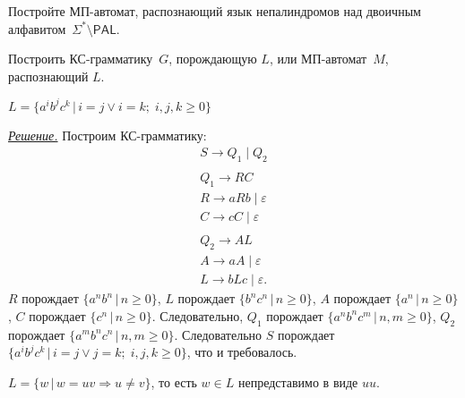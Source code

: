 \documentclass[10pt]{article}
\newcounter{pr} \setcounter{pr}{0}
\newcounter{subpr}[pr] \setcounter{subpr}{0}
\newenvironment{sol}
  {\par
   {\itshape \underline{Решение.}}}
  {}
\newcommand{\eps}{\varepsilon}
\newcommand{\PAL}{{\mathsf{PAL}}}
\newcommand{\yield}{\Rightarrow}
\begin{document}
  \begin{pr}
    Постройте МП-автомат, распознающий язык непалиндромов над двоичным
    алфавитом~$\Sigma^* \setminus \PAL$.
  \end{pr}
  \begin{pr}
    Построить КС-грамматику~$G$, порождающую $L$, или МП-автомат~$M$,
    распознающий $L$.
    \begin{subpr}
      $L = \{a^i b^j c^k \,|\, i = j \vee i = k;\; i, j, k \geq 0\}$
      \begin{sol}
        Построим КС-грамматику:
        \begin{gather*}
          S \rightarrow Q_1 \mid Q_2\\
          \\
          Q_1 \rightarrow RC\\
          R \rightarrow aRb \mid \eps\\
          C \rightarrow cC \mid \eps\\
          \\
          Q_2 \rightarrow AL\\
          A \rightarrow aA \mid \eps\\
          L \rightarrow bLc \mid \eps.
        \end{gather*}
        $R$ порождает $\{a^n b^n \,|\, n \geqslant 0\}$, $L$ порождает $\{b^n
        c^n \,|\, n \geqslant 0\}$, $A$ порождает $\{a^n \,|\, n \geqslant
        0\}$, $C$ порождает $\{c^n \,|\, n \geqslant 0\}$. Следовательно,
        $Q_1$ порождает $\{a^n b^n c^m \,|\, n, m \geqslant 0\}$, $Q_2$
        порождает $\{a^m b^n c^n \,|\, n, m \geqslant 0\}$. Следовательно $S$
        порождает $\{a^i b^j c^k \,|\, i = j \vee j = k;\; i, j, k \geqslant
        0\}$, что и требовалось.
      \end{sol}
    \end{subpr}
    \begin{subpr}[*]
      $L = \{w \,|\, w = uv \yield u \neq v \}$, то есть $w \in L$
      непредставимо в виде $uu$.
    \end{subpr}
  \end{pr}
\end{document}
